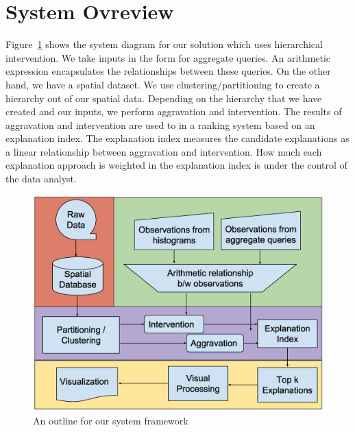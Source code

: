 \section{System Ovreview}

Figure~\ref{fig:framework} shows the system diagram for our solution which uses hierarchical intervention. We take inputs in the form for aggregate queries. An arithmetic expression encapsulates the relationships between these queries. On the other hand, we have a spatial dataset. We use clustering/partitioning to create a hierarchy out of our spatial data. Depending on the hierarchy that we have created and our inputs, we perform aggravation and intervention. The results of aggravation and intervention are used to in a ranking system based on an explanation index. The explanation index measures the candidate explanations as a linear relationship between aggravation and intervention. How much each explanation approach is weighted in the explanation index is under the control of the data analyst. 

\begin{figure}[t]
\includegraphics[width=\columnwidth]{images/framework}
\caption{An outline for our system framework}
\label{fig:framework}
\end{figure}

